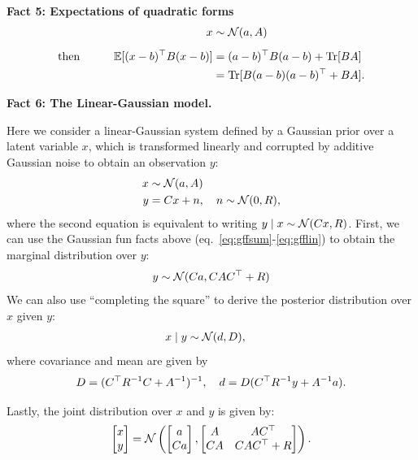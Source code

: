 \documentclass[10pt]{article}
\begin{document}
\begin{appendices}
{\bf  Fact 5: Expectations of quadratic forms}
\begin{alignat}{2}
  &\qquad&  x &\sim \mathcal{N}(a,A)  \nonumber \\[.5em]
 \text{then}& \qquad&
 \mathbb{E}[ (x-b)^\top B (x - b)] &= (a-b)^\top B (a-b) + \mathrm{Tr}[BA]  \nonumber \\
& & & = \mathrm{Tr}[B (a-b)(a-b)^\top + BA].
   \label{eq:gffqexp} 
\end{alignat}



{\bf Fact 6: The Linear-Gaussian model.}

Here we consider a linear-Gaussian system defined by a Gaussian prior
over a latent variable $x$, which is transformed linearly and
corrupted by additive Gaussian noise to obtain an observation $y$:
\begin{align}
 x &\sim \mathcal{N}(a,A) \\
  y &=Cx + n , \quad   n  \sim \mathcal{N}(0,R),
\end{align}
where the second equation is equivalent to writing
$ y \mid x \sim \mathcal{N}(Cx,R)$.
First, we can use the Gaussian fun facts above
(eq.~\ref{eq:gffsum}-\ref{eq:gfflin}) to obtain the marginal
distribution over $y$:
\begin{equation}
  \label{eq:13}
  y \sim \mathcal{N}(Ca, CAC^\top + R)
\end{equation}
We can also use ``completing the square'' to derive the posterior
distribution over $x$ given $y$:
\begin{align}
  x \mid y & \sim \mathcal{N}(d,D), \label{eq:gfflingauss}
\end{align}
where covariance and mean are given by
\begin{equation}
 D = (C^\top R^{-1} C + A^{-1})^{-1}, \quad 
   d = D  (C^\top R^{-1} y +A^{-1} a).
\end{equation}

Lastly, the joint distribution over $x$ and $y$ is given by:
\begin{equation}
  \label{eq:14}
  \begin{bmatrix}
    x \\ y
  \end{bmatrix} = \mathcal{N} \left(
    \begin{bmatrix}
      a \\ Ca 
    \end{bmatrix},
    \begin{bmatrix}
      A & AC^\top  \\
      CA & C A C^\top + R
    \end{bmatrix}
    \right).
\end{equation}


\end{appendices}
\end{document}

